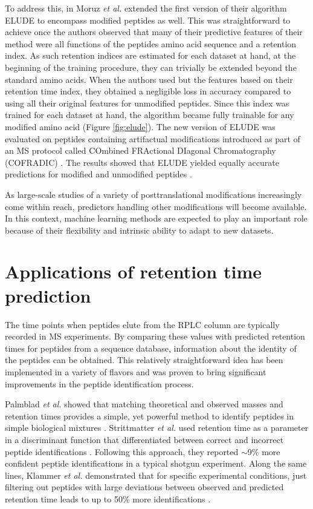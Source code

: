 \documentclass[a4paper]{article}
\begin{document}
To address this, in Moruz {\em et al.} \cite{elude2} extended the
first version of their algorithm {\sc ELUDE} to encompass modified
peptides as well. This was straightforward to achieve once the authors
observed that many of their predictive features of their method were
all functions of the peptides amino acid sequence and a retention
index. As such retention indices are estimated for each dataset at
hand, at the beginning of the training procedure, they can trivially
be extended beyond the standard amino acids. When the authors used but
the features based on their retention time index, they obtained a
negligible loss in accuracy compared to using all their original
features for unmodified peptides. Since this index was trained for
each dataset at hand, the algorithm became fully trainable for any
modified amino acid (Figure \ref{fig:elude}). The new version of {\sc
ELUDE} was evaluated on peptides containing artifactual modifications
introduced as part of an MS protocol called COmbined FRActional
DIagonal Chromatography (COFRADIC) \cite{Gevaert2002}. The results
showed that {\sc ELUDE} yielded equally accurate predictions for
modified and unmodified peptides \cite{elude2}.

As large-scale studies of a variety of posttranslational modifications
increasingly come within reach, predictors
handling other modifications will become available. In this context,
machine learning methods are expected to play an important role
because of their flexibility and intrinsic ability to adapt to new
datasets.


\section{\label{sec:app}Applications of retention time prediction}

The time points when peptides elute from the RPLC column are typically
recorded in MS experiments. By comparing these values with predicted
retention times for peptides from a sequence database, information
about the identity of the peptides can be obtained. This relatively
straightforward idea has been implemented in a variety of flavors and
was proven to bring significant improvements in the peptide
identification process.


Palmblad {\em et al.} showed that matching theoretical and observed
masses and retention times provides a simple, yet powerful method to
identify peptides in simple biological mixtures
\cite{palmblad2002prediction}. Strittmatter {\em et al.} used
retention time as a parameter in a discriminant function that
differentiated between correct and incorrect peptide identifications
\cite{Strittmatter2004}. Following this approach, they reported
$\sim$9\% more confident peptide identifications in a typical shotgun
experiment. Along the same lines, Klammer {\em et al.} demonstrated
that for specific experimental conditions, just filtering out peptides
with large deviations between observed and predicted retention time
leads to up to 50\% more identifications \cite{klammer2007improving}. 
\end{document}
